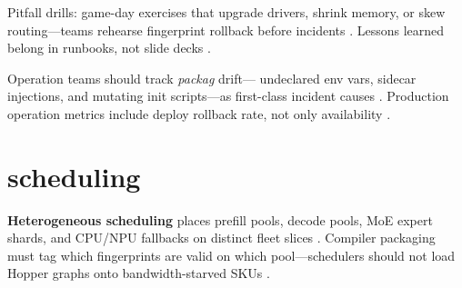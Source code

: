 Pitfall drills: game-day exercises that upgrade drivers, shrink memory, or skew routing---teams rehearse fingerprint rollback before incidents \citep{patel2025llminference,yirage2026,chen2020compilerbasedhardw,memoryfloor2026,taxbreak2026,kwon2023vllm,liu2024deepseekv3,amd2024aie,dlbook,semianalysis2024tma,amd2024xdna,dao2022flashattention,dao2023flashdecoding,nvidia2024cudagraphs,nvidia2022hopper,amd2024xdna}. Lessons learned belong in runbooks, not slide decks \citep{patel2025llminference,yirage2026,chen2020compilerbasedhardw,kwon2023vllm,memoryfloor2026,taxbreak2026,liu2024deepseekv3,amd2024aie,dlbook,semianalysis2024tma,amd2024xdna,dao2022flashattention,dao2023flashdecoding,nvidia2024cudagraphs,nvidia2022hopper}.

Operation teams should track \emph{packag} drift--- undeclared env vars, sidecar injections, and mutating init scripts---as first-class incident causes \citep{patel2025llminference,yirage2026,chen2020compilerbasedhardw,memoryfloor2026,taxbreak2026,kwon2023vllm,liu2024deepseekv3,amd2024aie,dlbook,semianalysis2024tma,amd2024xdna,dao2022flashattention,dao2023flashdecoding,nvidia2024cudagraphs,nvidia2022hopper}. Production operation metrics include deploy rollback rate, not only availability \citep{patel2025llminference,yirage2026,chen2020compilerbasedhardw,kwon2023vllm,memoryfloor2026,taxbreak2026,liu2024deepseekv3,amd2024aie,dlbook,semianalysis2024tma,amd2024xdna,dao2022flashattention,dao2023flashdecoding,nvidia2024cudagraphs,nvidia2022hopper}.

\section{scheduling}
\label{sec:ch26_scheduling}

\textbf{Heterogeneous scheduling} places prefill pools, decode pools, MoE expert shards, and CPU/NPU fallbacks on distinct fleet slices \citep{patel2025llminference,liu2024deepseekv3,kwon2023vllm,yirage2026,chen2020compilerbasedhardw,amd2024xdna,amd2024aie,dlbook,memoryfloor2026,taxbreak2026,semianalysis2024tma,dao2022flashattention,dao2023flashdecoding,nvidia2024cudagraphs,nvidia2022hopper}. Compiler packaging must tag which fingerprints are valid on which pool---schedulers should not load Hopper graphs onto bandwidth-starved SKUs \citep{memoryfloor2026,semianalysis2024tma,yirage2026,chen2020compilerbasedhardw,patel2025llminference,kwon2023vllm,liu2024deepseekv3,taxbreak2026,amd2024aie,dlbook,amd2024xdna,dao2022flashattention,dao2023flashdecoding,nvidia2024cudagraphs,nvidia2022hopper}.

